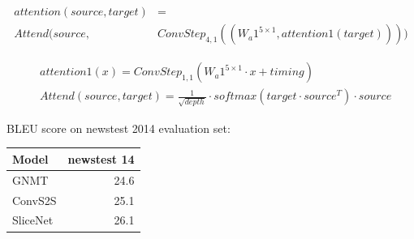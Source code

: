 \documentclass[a4paper]{article}
\begin{document}
\begin{align*}
  attention(source, target) &= \\
    Attend(source, &ConvStep_{4,1}((W_a1^{5 \times 1}, attention1(target))))
\end{align*}


\begin{align*}
  &attention1(x) = ConvStep_{1,1}(W_a1^{5 \times 1} \cdot x + timing) \\
  &Attend(source, target) = \frac{1}{\sqrt{depth}} \cdot
    softmax(target \cdot source^T) \cdot source
\end{align*}


BLEU score on newstest 2014 evaluation set:


\begin{center}
  \begin{tabular}{lr}
  \hline
    Model & newstest 14 \\
  \hline
    GNMT & 24.6 \\
    ConvS2S & 25.1 \\
    SliceNet & 26.1 \\
  \hline
  \end{tabular}
\end{center}




\end{document}

